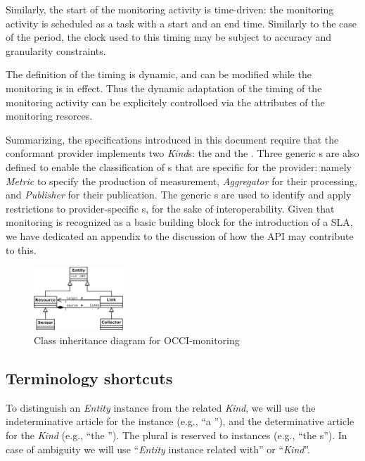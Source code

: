 \documentclass[10pt,a4paper]{article}
\begin{document}
Similarly, the start of the monitoring activity is time-driven: the monitoring activity is scheduled as a task with a start and an end time. Similarly to the case of the period, the clock used to this timing may be subject to accuracy and granularity constraints.

The definition of the timing is dynamic, and can be modified while the monitoring is in effect. Thus the dynamic adaptation of the timing of the monitoring activity can be explicitely controlloed via the attributes of the monitoring resorces.   

Summarizing, the specifications introduced in this document require that the conformant provider implements two {\em Kind}s: the {\em \coll } and the {\em \sens }. Three generic \mi s are also defined to enable the classification of \mi s that are specific for the provider: namely {\em Metric} to specify the production of measurement, {\em Aggregator} for their processing, and {\em Publisher} for their publication. The generic \mi s are used to identify and apply restrictions to provider-specific \mi s, for the sake of interoperability.  Given that monitoring is recognized as a basic building block for the introduction of a SLA, we have dedicated an appendix to the discussion of how the API may contribute to this.

\begin{figure}
\centering
\includegraphics[width=0.3\textwidth]{figs/Monitoring_UML.pdf}
\caption{Class inheritance diagram for OCCI-monitoring}
\end{figure}

\subsection{Terminology shortcuts}

To distinguish an {\em Entity} instance from the related {\em Kind}, we will use the indeterminative article for the instance (e.g., ``a \rs''), and the determinative article for the {\em Kind} (e.g., ``the \rs''). The plural is reserved to instances (e.g., ``the \rs s''). In case of ambiguity we will use ``{\em Entity} instance related with'' or ``{\em Kind}''. 
\end{document}
